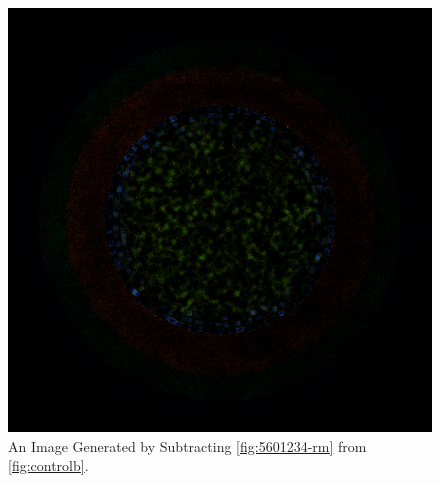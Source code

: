 \begin{figure}[H]
\centering
\includegraphics[width=0.6\linewidth]{figures/shuffle/diff-5601234}
\caption{An Image Generated by Subtracting \ref{fig:5601234-rm} from \ref{fig:controlb}.}
\label{fig:diff-5601234}
\end{figure}